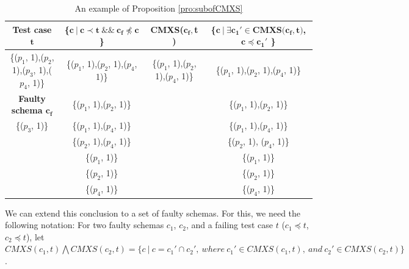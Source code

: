 \begin{table}[ht]
  \centering
  \setlength{\tabcolsep}{2pt}
  \caption{An example of Proposition \ref{pro:subofCMXS}}
  {\footnotesize
    \begin{tabular}{|c|c|c|c|}
    \hline
  \textbf{  Test case $\textbf{t}$} & \textbf{ \{$\textbf{c}\ |\ \textbf{c} \prec \textbf{t}\ \&\&\ \textbf{c}_{\textbf{f}} \npreceq \textbf{c}$\} }& \textbf{ CMXS($\textbf{c}_{\textbf{f}}, $\textbf{t}$ $)} & \textbf{\{$ \textbf{c}\ |\ \exists \textbf{c}_{\textbf{1}}' \in \textbf{CMXS}\textbf{(}\textbf{c}_{\textbf{f}}, \textbf{t}\textbf{)}$, $\textbf{c} \preceq \textbf{c}_{\textbf{1}}'$ \}}\\\hline
    \{($p_{1}$, 1),($p_{2}$, 1),($p_{3}$, 1),($p_{4}$, 1)\}  & \{($p_{1}$, 1),($p_{2}$, 1),($p_{4}$, 1)\} & \{($p_{1}$, 1),($p_{2}$, 1),($p_{4}$, 1)\} & \{($p_{1}$, 1),($p_{2}$, 1),($p_{4}$, 1)\}\\ \cline{1-1}
      \textbf{Faulty schema $\textbf{c}_{\textbf{f}}$}  & \{($p_{1}$, 1),($p_{2}$, 1)\} &  & \{($p_{1}$, 1),($p_{2}$, 1)\} \\\cline{1-1}
     \{($p_{3}$, 1)\}         & \{($p_{1}$, 1),($p_{4}$, 1)\}&  &\{($p_{1}$, 1),($p_{4}$, 1)\}\\
          &       \{($p_{2}$, 1),($p_{4}$, 1)\} &  &\{($p_{2}$, 1), ($p_{4}$, 1)\}\\
          &       \{($p_{1}$, 1)\} &  &\{($p_{1}$, 1)\}\\
          &       \{($p_{2}$, 1)\} &  &\{($p_{2}$, 1)\}\\
          &       \{($p_{4}$, 1)\} &  & \{($p_{4}$, 1)\}\\\hline
    \end{tabular}}%
  \label{examleOfCMXSPro}%
\end{table}%

%


We can extend this conclusion to a set of faulty schemas. For this, we need the following notation: For two faulty schemas $c_{1}$, $c_{2}$, and a failing test case $t$ ($c_{1} \preceq t$, $c_{2} \preceq t$), let $CMXS(c_{1}, t) \bigwedge CMXS(c_{2}, t)  = \{ c\ |\ c = c_{1}' \cap c_{2}',\ where\ c_{1}' \in CMXS(c_{1}, t),\ and\ c_{2}' \in CMXS(c_{2}, t) \}$.

